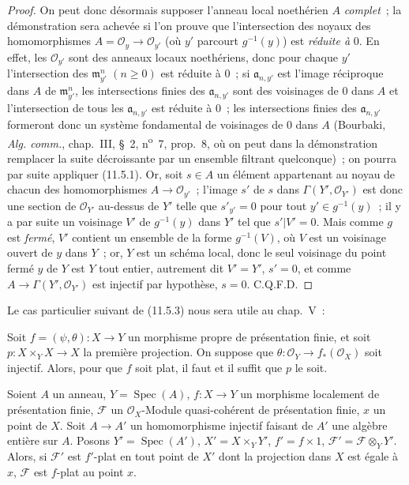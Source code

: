 \begin{proof}
On peut donc désormais supposer l'anneau local noethérien $A$ \emph{complet}~; la
démonstration sera achevée si l'on prouve que l'intersection des noyaux des
homomorphismes $A=\mathcal O_y\to\mathcal O_{y'}$ (où $y'$ parcourt
$g^{-1}(y)$) est \emph{réduite à} $0$. En effet, les $\mathcal O_{y'}$ sont des anneaux
locaux noethériens, donc pour chaque $y'$ l'intersection des
$\mathfrak m_{y'}^n$ $(n\geq0)$ est réduite à $0$~; si $\mathfrak a_{n,y'}$ est
l'image réciproque dans $A$ de $\mathfrak m_{y'}^n$, les intersections finies
des $\mathfrak a_{n,y'}$ sont des voisinages de $0$ dans $A$ et l'intersection de
tous les $\mathfrak a_{n,y'}$ est réduite à $0$~; les intersections finies des $\mathfrak a_{n,y'}$ formeront donc un système
fondamental de voisinages de $0$ dans $A$ (Bourbaki, \emph{Alg. comm.}, chap.~III,
\S~2, n\textsuperscript{o}~7, prop.~8, où on peut dans la démonstration remplacer la suite décroissante par un
ensemble filtrant quelconque)~; on pourra par suite appliquer (11.5.1).
Or, soit $s\in A$ un élément appartenant au noyau de chacun des homomorphismes
$A\to\mathcal O_{y'}$~; l'image $s'$ de $s$ dans
$\Gamma(Y',\mathcal O_{Y'})$ est donc une section de $\mathcal O_{Y'}$ au-dessus
de $Y'$ telle que $s'_{y'}=0$ pour tout $y'\in g^{-1}(y)$~; il y a par suite un
voisinage $V'$ de $g^{-1}(y)$ dans $Y'$ tel que $s'|V'=0$. Mais comme $g$ est
\emph{fermé}, $V'$ contient un ensemble de la forme $g^{-1}(V)$, où $V$ est un
voisinage ouvert de $y$ dans $Y$~; or, $Y$ est un schéma local, donc le seul
voisinage du point fermé $y$ de $Y$ est $Y$ tout entier, autrement dit $V'=Y'$,
$s'=0$, et comme $A\to\Gamma(Y',\mathcal O_{Y'})$ est injectif par hypothèse,
$s=0$. C.Q.F.D.
\end{proof}

Le cas particulier suivant de (11.5.3) nous sera utile au chap.~V~:

\begin{corollary}[11.5.4]
\label{IV.11.5.4-fr}
Soit $f=(\psi,\theta):X\to Y$ un morphisme \textup{propre} de présentation finie, et
soit $p:X\times_YX\to X$ la première projection. On suppose que
$\theta:\mathcal O_Y\to f_*(\mathcal O_X)$ soit injectif. Alors, pour que $f$
soit plat, il faut et il suffit que $p$ le soit.
\end{corollary}

\begin{proposition}[11.5.5]
\label{IV.11.5.5-fr}
Soient $A$ un anneau, $Y=\operatorname{Spec}(A)$, $f:X\to Y$ un morphisme
localement de présentation finie, $\mathcal F$ un $\mathcal O_X$-Module
quasi-cohérent de présentation finie, $x$ un point de $X$. Soit
$A\to A'$ un homomorphisme injectif faisant de $A'$ une algèbre \textup{entière} sur $A$.
Posons $Y'=\operatorname{Spec}(A')$, $X'=X\times_Y Y'$, $f'=f\times1$,
$\mathcal F'=\mathcal F\otimes_Y Y'$. Alors, si $\mathcal F'$ est $f'$-plat en
\textup{tout} point de $X'$ dont la projection dans $X$ est égale à $x$, $\mathcal F$ est
$f$-plat au point $x$.
\end{proposition}


